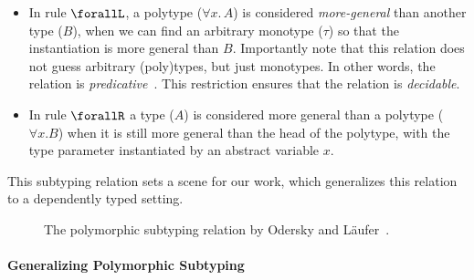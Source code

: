 \begin{itemize}
  \item In rule $\forallL$, a polytype ($\forall x.\, A$) is considered \emph{more-general}
        than another type ($B$), when we can find an arbitrary monotype ($\tau$)
        so that the instantiation is more general than $B$.
        Importantly note that this relation does not guess arbitrary (poly)types,
        but just monotypes. In other words, the relation is \emph{predicative}~\cite{Martin-Lof-1972}.
        This restriction ensures that the relation is \emph{decidable}.

  \item In rule  $\forallR$ a type ($A$) is considered more general than a polytype ($\forall x. B$)
        when it is still more general than the head of the polytype, with the type
        parameter instantiated by an abstract variable $x$.
\end{itemize}

This subtyping relation sets a scene for our work, which
generalizes this relation to a dependently typed setting.

\begin{figure}
\centering


\caption{The polymorphic subtyping relation by Odersky and L\"aufer~\cite{odersky1996putting}.}
\label{fig:polymorphic-subtyping}
\end{figure}


\paragraph{Generalizing Polymorphic Subtyping}
\label{sec:polymorphic-subtyping}

